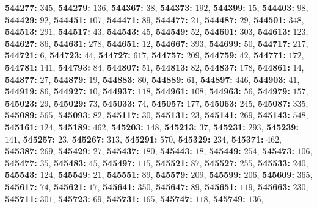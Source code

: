 \textsf{\bfseries 544277:} $345$, \textsf{\bfseries 544279:} $136$, \textsf{\bfseries 544367:} $38$, \textsf{\bfseries 544373:} $192$, \textsf{\bfseries 544399:} $15$, \textsf{\bfseries 544403:} $98$, \textsf{\bfseries 544429:} $92$, \textsf{\bfseries 544451:} $107$, \textsf{\bfseries 544471:} $89$, \textsf{\bfseries 544477:} $21$, \textsf{\bfseries 544487:} $29$, \textsf{\bfseries 544501:} $348$, \textsf{\bfseries 544513:} $291$, \textsf{\bfseries 544517:} $43$, \textsf{\bfseries 544543:} $45$, \textsf{\bfseries 544549:} $52$, \textsf{\bfseries 544601:} $303$, \textsf{\bfseries 544613:} $123$, \textsf{\bfseries 544627:} $86$, \textsf{\bfseries 544631:} $278$, \textsf{\bfseries 544651:} $12$, \textsf{\bfseries 544667:} $393$, \textsf{\bfseries 544699:} $50$, \textsf{\bfseries 544717:} $217$, \textsf{\bfseries 544721:} $6$, \textsf{\bfseries 544723:} $44$, \textsf{\bfseries 544727:} $617$, \textsf{\bfseries 544757:} $209$, \textsf{\bfseries 544759:} $42$, \textsf{\bfseries 544771:} $172$, \textsf{\bfseries 544781:} $141$, \textsf{\bfseries 544793:} $84$, \textsf{\bfseries 544807:} $51$, \textsf{\bfseries 544813:} $82$, \textsf{\bfseries 544837:} $178$, \textsf{\bfseries 544861:} $14$, \textsf{\bfseries 544877:} $27$, \textsf{\bfseries 544879:} $19$, \textsf{\bfseries 544883:} $80$, \textsf{\bfseries 544889:} $61$, \textsf{\bfseries 544897:} $446$, \textsf{\bfseries 544903:} $41$, \textsf{\bfseries 544919:} $86$, \textsf{\bfseries 544927:} $10$, \textsf{\bfseries 544937:} $118$, \textsf{\bfseries 544961:} $108$, \textsf{\bfseries 544963:} $56$, \textsf{\bfseries 544979:} $157$, \textsf{\bfseries 545023:} $29$, \textsf{\bfseries 545029:} $73$, \textsf{\bfseries 545033:} $74$, \textsf{\bfseries 545057:} $177$, \textsf{\bfseries 545063:} $245$, \textsf{\bfseries 545087:} $335$, \textsf{\bfseries 545089:} $565$, \textsf{\bfseries 545093:} $82$, \textsf{\bfseries 545117:} $30$, \textsf{\bfseries 545131:} $23$, \textsf{\bfseries 545141:} $269$, \textsf{\bfseries 545143:} $548$, \textsf{\bfseries 545161:} $124$, \textsf{\bfseries 545189:} $462$, \textsf{\bfseries 545203:} $148$, \textsf{\bfseries 545213:} $37$, \textsf{\bfseries 545231:} $293$, \textsf{\bfseries 545239:} $141$, \textsf{\bfseries 545257:} $23$, \textsf{\bfseries 545267:} $313$, \textsf{\bfseries 545291:} $570$, \textsf{\bfseries 545329:} $234$, \textsf{\bfseries 545371:} $462$, \textsf{\bfseries 545387:} $269$, \textsf{\bfseries 545429:} $27$, \textsf{\bfseries 545437:} $180$, \textsf{\bfseries 545443:} $18$, \textsf{\bfseries 545449:} $254$, \textsf{\bfseries 545473:} $106$, \textsf{\bfseries 545477:} $35$, \textsf{\bfseries 545483:} $45$, \textsf{\bfseries 545497:} $115$, \textsf{\bfseries 545521:} $87$, \textsf{\bfseries 545527:} $255$, \textsf{\bfseries 545533:} $240$, \textsf{\bfseries 545543:} $124$, \textsf{\bfseries 545549:} $21$, \textsf{\bfseries 545551:} $89$, \textsf{\bfseries 545579:} $209$, \textsf{\bfseries 545599:} $206$, \textsf{\bfseries 545609:} $365$, \textsf{\bfseries 545617:} $74$, \textsf{\bfseries 545621:} $17$, \textsf{\bfseries 545641:} $350$, \textsf{\bfseries 545647:} $89$, \textsf{\bfseries 545651:} $119$, \textsf{\bfseries 545663:} $230$, \textsf{\bfseries 545711:} $301$, \textsf{\bfseries 545723:} $69$, \textsf{\bfseries 545731:} $165$, \textsf{\bfseries 545747:} $118$, \textsf{\bfseries 545749:} $136$, 
